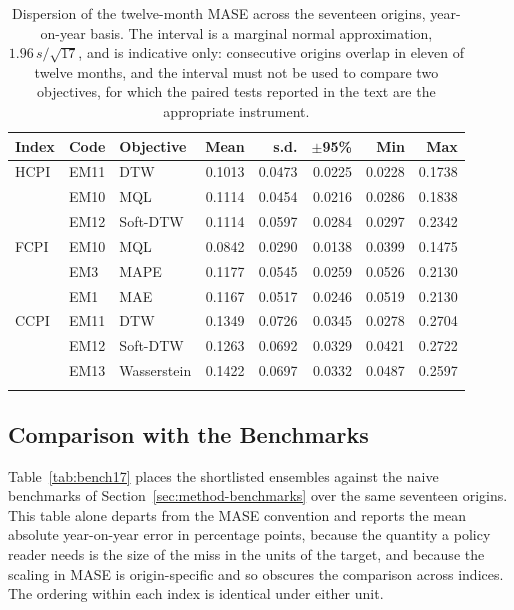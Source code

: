 \documentclass[12pt]{article}
\begin{document}
\begin{table}[htbp]\centering
\caption{Dispersion of the twelve-month MASE across the seventeen origins, year-on-year basis. The interval is a marginal normal approximation, $1.96\,s/\sqrt{17}$, and is indicative only: consecutive origins overlap in eleven of twelve months, and the interval must not be used to compare two objectives, for which the paired tests reported in the text are the appropriate instrument.}
\label{tab:precision17}
\begin{threeparttable}\small
\begin{tabular}{@{}l l l r r r r r@{}}
\toprule
Index & Code & Objective & Mean & s.d. & $\pm$95\% & Min & Max \\
\midrule
HCPI & EM11 & DTW & 0.1013 & 0.0473 & 0.0225 & 0.0228 & 0.1738 \\
 & EM10 & MQL & 0.1114 & 0.0454 & 0.0216 & 0.0286 & 0.1838 \\
 & EM12 & Soft-DTW & 0.1114 & 0.0597 & 0.0284 & 0.0297 & 0.2342 \\
\addlinespace[2pt]
FCPI & EM10 & MQL & 0.0842 & 0.0290 & 0.0138 & 0.0399 & 0.1475 \\
 & EM3 & MAPE & 0.1177 & 0.0545 & 0.0259 & 0.0526 & 0.2130 \\
 & EM1 & MAE & 0.1167 & 0.0517 & 0.0246 & 0.0519 & 0.2130 \\
\addlinespace[2pt]
CCPI & EM11 & DTW & 0.1349 & 0.0726 & 0.0345 & 0.0278 & 0.2704 \\
 & EM12 & Soft-DTW & 0.1263 & 0.0692 & 0.0329 & 0.0421 & 0.2722 \\
 & EM13 & Wasserstein & 0.1422 & 0.0697 & 0.0332 & 0.0487 & 0.2597 \\
\addlinespace[2pt]
\bottomrule
\end{tabular}\end{threeparttable}\end{table}

\subsection{Comparison with the Benchmarks}
\label{sec:res-benchmarks17}

Table~\ref{tab:bench17} places the shortlisted ensembles against the naive
benchmarks of Section~\ref{sec:method-benchmarks} over the same seventeen
origins. This table alone departs from the MASE convention and reports the mean
absolute year-on-year error in percentage points, because the quantity a policy
reader needs is the size of the miss in the units of the target, and because
the scaling in MASE is origin-specific and so obscures the comparison across
indices. The ordering within each index is identical under either unit.
\end{document}
